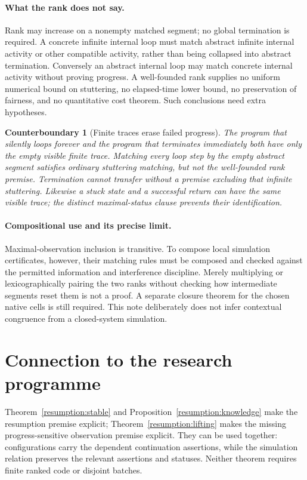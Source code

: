 \documentclass[11pt]{article}
\newtheorem{example}[theorem]{Counterboundary}
\begin{document}
\paragraph{What the rank does not say.} Rank may increase on a nonempty matched segment; no global termination is required. A concrete infinite internal loop must match abstract infinite internal activity or other compatible activity, rather than being collapsed into abstract termination. Conversely an abstract internal loop may match concrete internal activity without proving progress. A well-founded rank supplies no uniform numerical bound on stuttering, no elapsed-time lower bound, no preservation of fairness, and no quantitative cost theorem. Such conclusions need extra hypotheses.

\begin{example}[Finite traces erase failed progress]
The program that silently loops forever and the program that terminates immediately both have only the empty visible finite trace. Matching every loop step by the empty abstract segment satisfies ordinary stuttering matching, but not the well-founded rank premise. Termination cannot transfer without a premise excluding that infinite stuttering. Likewise a stuck state and a successful return can have the same visible trace; the distinct maximal-status clause prevents their identification.
\end{example}

\paragraph{Compositional use and its precise limit.} Maximal-observation inclusion is transitive. To compose local simulation certificates, however, their matching rules must be composed and checked against the permitted information and interference discipline. Merely multiplying or lexicographically pairing the two ranks without checking how intermediate segments reset them is not a proof. A separate closure theorem for the chosen native cells is still required. This note deliberately does not infer contextual congruence from a closed-system simulation.

\section{Connection to the research programme}
Theorem~\ref{resumption:stable} and Proposition~\ref{resumption:knowledge} make the resumption premise explicit; Theorem~\ref{resumption:lifting} makes the missing progress-sensitive observation premise explicit. They can be used together: configurations carry the dependent continuation assertions, while the simulation relation preserves the relevant assertions and statuses. Neither theorem requires finite ranked code or disjoint batches.
\end{document}
